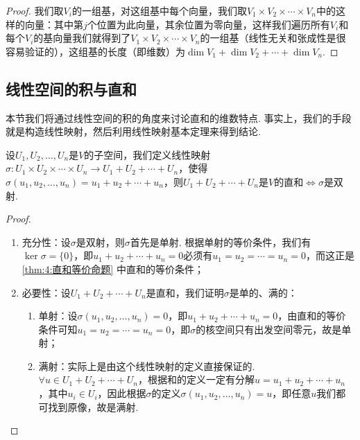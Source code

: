 \begin{proof}
    我们取$V_i$的一组基，对这组基中每个向量，我们取$V_1 \times V_2 \times \cdots \times V_n$中的这样的向量：其中第$j$个位置为此向量，其余位置为零向量，这样我们遍历所有$V_i$和每个$V_i$的基向量我们就得到了$V_1 \times V_2 \times \cdots \times V_n$的一组基（线性无关和张成性是很容易验证的），这组基的长度（即维数）为$\dim V_1+\dim V_2+\cdots+\dim V_n$.
\end{proof}

\subsection{线性空间的积与直和}

本节我们将通过线性空间的积的角度来讨论直和的维数特点. 事实上，我们的手段就是构造线性映射，然后利用线性映射基本定理来得到结论.
\begin{theorem}\label{thm:8:积与直和}
    设$U_1,U_2,\ldots,U_n$是$V$的子空间，我们定义线性映射$\sigma:U_1 \times U_2 \times \cdots \times U_n \to U_1+U_2+\cdots+U_n$，使得$\sigma(u_1,u_2,\ldots,u_n)=u_1+u_2+\cdots+u_n$，则$U_1+U_2+\cdots+U_n$是$V$的直和$\iff \sigma$是双射.
\end{theorem}

\begin{proof}
    \begin{enumerate}
        \item 充分性：设$\sigma$是双射，则$\sigma$首先是单射. 根据单射的等价条件，我们有$\ker \sigma=\{0\}$，即$u_1+u_2+\cdots+u_n=0$必须有$u_1=u_2=\cdots=u_n=0$，而这正是\autoref{thm:4:直和等价命题} 中直和的等价条件；

        \item 必要性：设$U_1+U_2+\cdots+U_n$是直和，我们证明$\sigma$是单的、满的：
              \begin{enumerate}
                  \item 单射：设$\sigma(u_1,u_2,\ldots,u_n)=0$，即$u_1+u_2+\cdots+u_n=0$，由直和的等价条件可知$u_1=u_2=\cdots=u_n=0$，即$\sigma$的核空间只有出发空间零元，故是单射；

                  \item 满射：实际上是由这个线性映射的定义直接保证的. $\forall u \in U_1+U_2+\cdots+U_n$，根据和的定义一定有分解$u=u_1+u_2+\cdots+u_n$，其中$u_i \in U_i$，因此根据$\sigma$的定义$\sigma(u_1,u_2,\ldots,u_n)=u$，即任意$u$我们都可找到原像，故是满射.
              \end{enumerate}
    \end{enumerate}
\end{proof}

